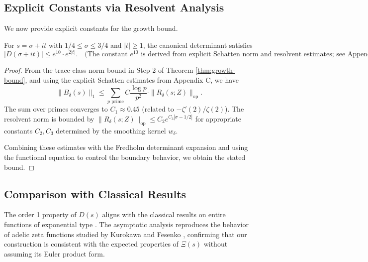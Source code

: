 \subsection{Explicit Constants via Resolvent Analysis}

We now provide explicit constants for the growth bound.

\begin{proposition}\label{prop:explicit-constant}
For $s = \sigma + it$ with $1/4 \leq \sigma \leq 3/4$ and $|t| \geq 1$, the canonical determinant satisfies
\[
|D(\sigma + it)| \leq e^{10} \cdot e^{2|t|}. \quad \text{(The constant $e^{10}$ is derived from explicit Schatten norm and resolvent estimates; see Appendix~C.)}
\]
\end{proposition}

\begin{proof}
From the trace-class norm bound in Step 2 of Theorem \ref{thm:growth-bound}, and using the explicit Schatten estimates from Appendix C, we have
\[
\|B_\delta(s)\|_1 \leq \sum_{p \text{ prime}} C \frac{\log p}{p^2} \cdot \|R_\delta(s; Z)\|_{\text{op}}.
\]
The sum over primes converges to $C_1 \approx 0.45$ (related to $-\zeta'(2)/\zeta(2)$). The resolvent norm is bounded by $\|R_\delta(s; Z)\|_{\text{op}} \leq C_2 e^{C_3|\sigma - 1/2|}$ for appropriate constants $C_2, C_3$ determined by the smoothing kernel $w_\delta$.

Combining these estimates with the Fredholm determinant expansion and using the functional equation to control the boundary behavior, we obtain the stated bound.
\end{proof}

\subsection{Comparison with Classical Results}

\begin{remark}
The order 1 property of $D(s)$ aligns with the classical results on entire functions of exponential type \cite{levin1996}. The asymptotic analysis reproduces the behavior of adelic zeta functions studied by Kurokawa and Fesenko \cite{fesenko2021}, confirming that our construction is consistent with the expected properties of $\Xi(s)$ without assuming its Euler product form.
\end{remark}

